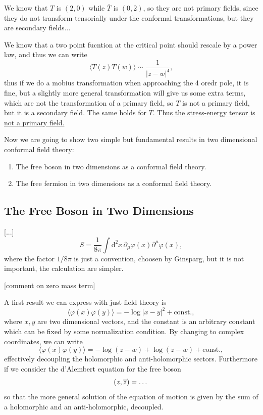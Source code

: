 We know that \(T\) is \((2,0)\) while \(\overline{T}\) is \((0,2)\), so they are not primary fields, since they do not transform tensorially under the conformal transformations, but they are secondary fields...

We know that a two point fucntion at the critical point should rescale by a power law, and thus we can write
\[
    \langle T(z)T(w)\rangle \sim \frac{1}{\vert z- w \vert^4 },
\]
thus if we do a mobius transformation when approaching the 4 oredr pole, it is fine, but a slightly more general transformation will give us some extra terms, which are not the transformation of a primary field, so \(T\) is not a primary field, but it is a secondary field. The same holds for \(\overline{T}\). \uline{Thus the stress-energy tensor is not a primary field.}

Now we are going to show two simple but fundamental results in two dimensional conformal field theory:
\begin{enumerate}
    \item The free boson in two dimensions as a conformal field theory.
    \item The free fermion in two dimensions as a conformal field theory.
\end{enumerate}

\subsection{The Free Boson in Two Dimensions}

[...]
\[
    S = \frac{1}{8\pi} \int \mathrm{d}^2 x \, \partial_\mu \varphi(x) \partial^\mu \varphi(x),
\]
where the factor \(1/8\pi\) is just a convention, choosen by Ginsparg, but it is not important, the calculation are simpler.

    [comment on zero mass term]

A first result we can express with just field theory is
\[
    \langle \varphi(x)\varphi(y) \rangle = - \log \vert x - y \vert^2 + \text{const.},
\]
where \(x,y\) are two dimensional vectors, and the constant is an arbitrary constant which can be fixed by some normalization condition. By changing to complex coordinates, we can write
\[
    \langle \varphi(x)\varphi(y)\rangle = - \log (z - w ) + \log (\overline{z} - \overline{w}) + \text{const.},
\]
effectively decoupling the holomorphic and anti-holomorphic sectors. Furthermore if we consider the d'Alembert equation for the free boson
\[
    \box \varphi(z,\overline{z}) = \dots
\]
so that the more general solution of the equation of motion is given by the sum of a holomorphic and an anti-holomorphic, decoupled.

